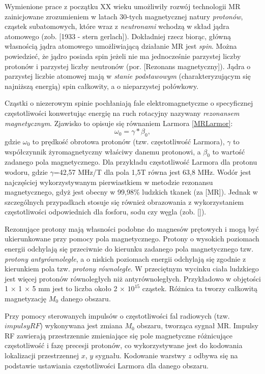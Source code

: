 Wymienione prace z początku XX wieku umożliwiły rozwój technologii MR zainicjowane zrozumieniem w latach 30-tych magnetycznej natury \textit{protonów}, cząstek subatomowych, które wraz z \textit{neutronami} wchodzą w skład jądra atomowego (zob. [1933 - stern gerlach]). Dokładniej rzecz biorąc, główną własnością jądra atomowego umożliwiającą działanie MR jest \textit{spin}. Można powiedzieć, że jądro posiada spin jeżeli nie ma jednocześnie parzystej liczby protonów i parzystej liczby neutronów (por. [Rezonans magnetyczny]). Jądra o parzystej liczbie atomowej mają w \textit{stanie podstawowym} (charakteryzującym się najniższą energią) spin całkowity, a o nieparzystej połówkowy.

Cząstki o niezerowym spinie pochłaniają fale elektromagnetyczne o specyficznej częstotliwości konwertując energię na ruch rotacyjny nazywany \textit{rezonansem magnetycznym}. Zjawisko to opisuje się równaniem Larmora \ref{MRLarmor}:
\begin{equation}
\label{MRLarmor}
\omega_0 = \gamma \ast \beta_0,
\end{equation}
gdzie $\omega_0$ to prędkość obrotowa protonów (tzw. częstotliwość Larmora), $\gamma$ to współczynnik żyromagnetyczny właściwy danemu protonowi, a $\beta_0$ to wartość zadanego pola magnetycznego. Dla przykładu częstotliwość Larmora dla protonu wodoru, gdzie $\gamma$=42,57 MHz/T dla pola 1,5T równa jest 63,8 MHz. Wodór jest najczęściej wykorzystywanym pierwiastkiem w metodzie rezonansu magnetycznego, gdyż jest obecny w 99,98\% ludzkich tkanek (za [MR]). Jednak w szczególnych przypadkach stosuje się również obrazowania z wykorzystaniem częstotliwości odpowiednich dla fosforu, sodu czy węgla (zob. []).

Rezonujące protony mają własności podobne do magnesów prętowych i mogą być ukierunkowane przy pomocy pola magnetycznego. Protony o wysokich poziomach energii odchylają się przeciwnie do kierunku zadanego pola magnetycznego tzw. \textit{protony antyrównoległe}, a o niskich poziomach energii odchylają się zgodnie z kierunkiem pola tzw. \textit{protony równoległe}. W przeciętnym wycinku ciała ludzkiego jest więcej protonów równoległych niż antyrównoległych. Przykładowo w objętości 1 $\times$ 1 $\times$ 5 mm jest to liczba około 2 $\times$ $10^15$ cząstek. Różnica ta tworzy całkowitą magnetyzację $M_0$ danego obszaru.

Przy pomocy sterowanych impulsów o częstotliwości fal radiowych (tzw. $impulsy RF$) wykonywana jest zmiana $M_0$ obszaru, tworząca sygnał MR. Impulsy RF zawierają przestrzennie zmieniające się pole magnetyczne różnicujące częstotliwość i fazę precesji protonów, co wykorzystywane jest do kodowania lokalizacji przestrzennej $x$, $y$ sygnału. Kodowanie warstwy $z$ odbywa się na podstawie ustawiania częstotliwości Larmora dla danego obszaru.

